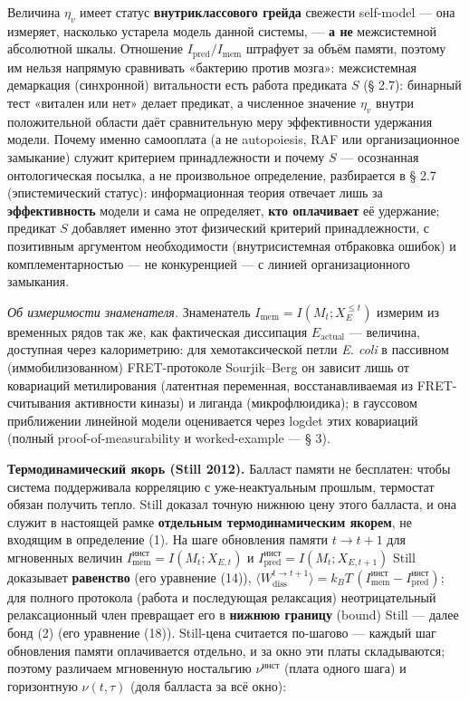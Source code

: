 \documentclass[pdflatex,sn-mathphys-ay]{sn-jnl}
\begin{document}
Величина \(\eta_v\) имеет статус \textbf{внутриклассового грейда} свежести self-model --- она измеряет, насколько устарела модель данной системы, --- \textbf{а не} межсистемной абсолютной шкалы. Отношение \(I_{\text{pred}}/I_{\text{mem}}\) штрафует за объём памяти, поэтому им нельзя напрямую сравнивать «бактерию против мозга»: межсистемная демаркация (синхронной) витальности есть работа предиката \(S\) (§ 2.7): бинарный тест «витален или нет» делает предикат, а численное значение \(\eta_v\) внутри положительной области даёт сравнительную меру эффективности удержания модели. Почему именно самооплата (а не autopoiesis, RAF или организационное замыкание) служит критерием принадлежности и почему \(S\) --- осознанная онтологическая посылка, а не произвольное определение, разбирается в § 2.7 (эпистемический статус): информационная теория отвечает лишь за \textbf{эффективность} модели и сама не определяет, \textbf{кто оплачивает} её удержание; предикат \(S\) добавляет именно этот физический критерий принадлежности, с позитивным аргументом необходимости (внутрисистемная отбраковка ошибок) и комплементарностью --- не конкуренцией --- с линией организационного замыкания.

\emph{Об измеримости знаменателя.} Знаменатель \(I_{\text{mem}} = I(M_t; X_E^{\le t})\) измерим из временных рядов так же, как фактическая диссипация \(E_{\text{actual}}\) --- величина, доступная через калориметрию: для хемотаксической петли \emph{E. coli} в пассивном (иммобилизованном) FRET-протоколе Sourjik--Berg он зависит лишь от ковариаций метилирования (латентная переменная, восстанавливаемая из FRET-считывания активности киназы) и лиганда (микрофлюидика); в гауссовом приближении линейной модели оценивается через logdet этих ковариаций (полный proof-of-measurability и worked-example --- § 3).

\textbf{Термодинамический якорь (Still 2012).} Балласт памяти не бесплатен: чтобы система поддерживала корреляцию с уже-неактуальным прошлым, термостат обязан получить тепло. Still доказал точную нижнюю цену этого балласта, и она служит в настоящей рамке \textbf{отдельным термодинамическим якорем}, не входящим в определение (1). На шаге обновления памяти \(t \to t+1\) для мгновенных величин \(I_{\text{mem}}^{\text{инст}} = I(M_t; X_{E,t})\) и \(I_{\text{pred}}^{\text{инст}} = I(M_t; X_{E,t+1})\) Still доказывает \textbf{равенство} (его уравнение (14)), \(\langle W_{\text{diss}}^{t\to t+1}\rangle = k_B T\,(I_{\text{mem}}^{\text{инст}} - I_{\text{pred}}^{\text{инст}})\); для полного протокола (работа и последующая релаксация) неотрицательный релаксационный член превращает его в \textbf{нижнюю границу} (bound) Still --- далее бонд (2) (его уравнение (18)). Still-цена считается по-шагово --- каждый шаг обновления памяти оплачивается отдельно, и за окно эти платы складываются; поэтому различаем мгновенную ностальгию \(\nu^{\text{инст}}\) (плата одного шага) и горизонтную \(\nu(t,\tau)\) (доля балласта за всё окно):
\end{document}
